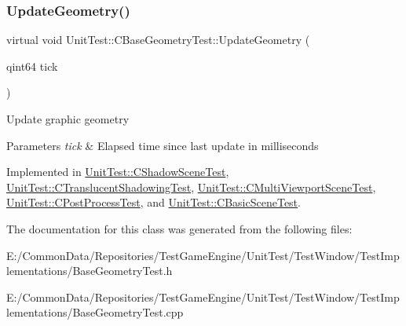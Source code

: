 \subsubsection{\texorpdfstring{UpdateGeometry()}{UpdateGeometry()}}
{\footnotesize\ttfamily virtual void Unit\+Test\+::\+C\+Base\+Geometry\+Test\+::\+Update\+Geometry (\begin{DoxyParamCaption}\item[{qint64}]{tick }\end{DoxyParamCaption})\hspace{0.3cm}{\ttfamily [pure virtual]}}

Update graphic geometry 
\begin{DoxyParams}{Parameters}
{\em tick} & Elapsed time since last update in milliseconds \\
\hline
\end{DoxyParams}


Implemented in \mbox{\hyperlink{class_unit_test_1_1_c_shadow_scene_test_a5586404efaf70bc59cefd4616fe7f761}{Unit\+Test\+::\+C\+Shadow\+Scene\+Test}}, \mbox{\hyperlink{class_unit_test_1_1_c_translucent_shadowing_test_a6d0809018d48d6f3f9e80147b894da5d}{Unit\+Test\+::\+C\+Translucent\+Shadowing\+Test}}, \mbox{\hyperlink{class_unit_test_1_1_c_multi_viewport_scene_test_a1a321eb10c463501feb70cb61b1add01}{Unit\+Test\+::\+C\+Multi\+Viewport\+Scene\+Test}}, \mbox{\hyperlink{class_unit_test_1_1_c_post_process_test_aa1da5079813a860b1cc8a3554bce6f04}{Unit\+Test\+::\+C\+Post\+Process\+Test}}, and \mbox{\hyperlink{class_unit_test_1_1_c_basic_scene_test_a670726a40875ee0981cca18a3ea7ad0b}{Unit\+Test\+::\+C\+Basic\+Scene\+Test}}.



The documentation for this class was generated from the following files\+:\begin{DoxyCompactItemize}
\item 
E\+:/\+Common\+Data/\+Repositories/\+Test\+Game\+Engine/\+Unit\+Test/\+Test\+Window/\+Test\+Implementations/Base\+Geometry\+Test.\+h\item 
E\+:/\+Common\+Data/\+Repositories/\+Test\+Game\+Engine/\+Unit\+Test/\+Test\+Window/\+Test\+Implementations/Base\+Geometry\+Test.\+cpp\end{DoxyCompactItemize}
